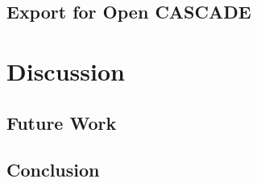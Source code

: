 \documentclass[a4paper, 11pt]{report}
\theoremstyle{definition}
\begin{document}
\section{Export for Open CASCADE}

\chapter{Discussion}
\section{Future Work}
\section{Conclusion}
\cite{Piegl1997}

\printbibliography[heading=bibnumbered, title=References]
\end{document}

